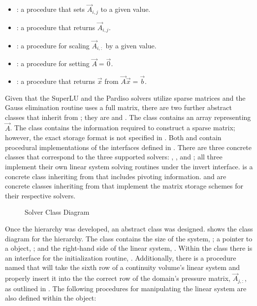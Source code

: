 \begin{itemize}
\item{ : a procedure that sets $\vec{A}_{i,j}$ to a given value.}
\item{ : a procedure that returns $\vec{A}_{i,j}$.}
\item{ : a procedure for scaling $\vec{A}_{i, :}$ by a given value.}
\item{ : a procedure for setting $\vec{A} = \vec{0}$.}
\item{ : a procedure that returns $\vec{x}$ from $\vec{A}\vec{x} = \vec{b}$.}
\end{itemize}

Given that the SuperLU and the Pardiso solvers utilize sparse matrices and the Gauss elimination routine uses a full matrix, there are two further abstract classes that inherit from ; they are  and .
The  class contains an array representing $\vec{A}$.
The  class contains the information required to construct a sparse matrix; however, the exact storage format is not specified in .
Both  and  contain procedural implementations of the interfaces defined in .
There are three concrete classes that correspond to the three supported solvers: , , and ; all three implement their own linear system solving routines under the invert interface.
 is a concrete class inheriting from  that includes pivoting information.
 and  are concrete classes inheriting from  that implement the matrix storage schemes for their respective solvers.

\begin{figure}[ht!]
\singlespace\centering

\caption{Solver Class Diagram}
\label{fig:solverClassDiagram}
\end{figure}

Once the  hierarchy was developed, an abstract  class was designed.
 shows the class diagram for the  hierarchy.
The  class contains the size of the system, ; a pointer to a  object, ; and the right-hand side of the linear system, .
Within the  class there is an interface for the initialization routine, .
Additionally, there is a procedure named  that will take the sixth row of a continuity volume's linear system and properly insert it into the the correct row of the domain's pressure matrix, $\vec{A}_{j,:}$, as outlined in .
The following procedures for manipulating the linear system are also defined within the  object:


